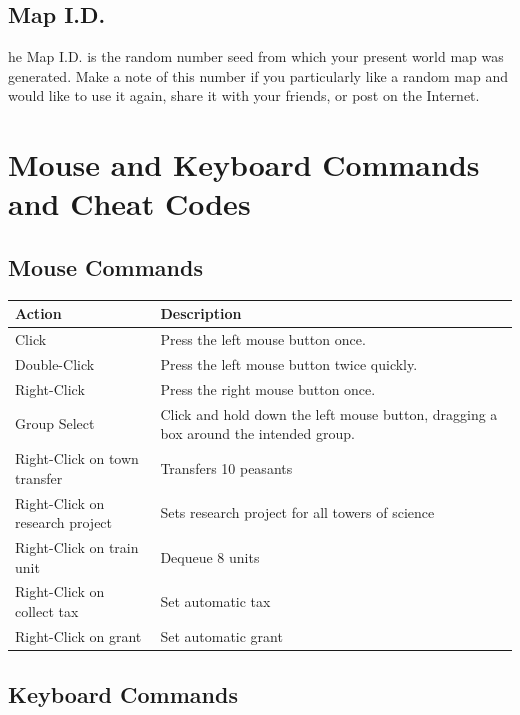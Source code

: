 \subsection{Map I.D.}

he Map I.D. is the random number seed from which your present world map was generated. Make a note of this number if you particularly like a random map and would like to use it again, share it with your friends, or post on the Internet.

\section{Mouse and Keyboard Commands and Cheat Codes}


\subsection{Mouse Commands}

\begin{center}
	\begin{tabular}{|p{2in}|p{2in}|}
		\hline
		Action	& Description \\ \hline
		Click	& Press the left mouse button once. \\ \hline
		Double-Click	& Press the left mouse button twice quickly. \\ \hline
		Right-Click	& Press the right mouse button once. \\ \hline
		Group Select	& Click and hold down the left mouse button, dragging a box around the intended group. \\ \hline
		Right-Click on town transfer	& Transfers 10 peasants \\ \hline
		Right-Click on research project	& Sets research project for all towers of science \\ \hline
		Right-Click on train unit	& Dequeue 8 units \\ \hline
		Right-Click on collect tax	& Set automatic tax \\ \hline
		Right-Click on grant	&  Set automatic grant \\
		\hline
	\end{tabular}
\end{center}

\clearpage

\subsection{Keyboard Commands}

